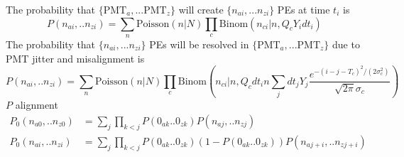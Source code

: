 \documentclass[12pt]{report}
\begin{document}
The probability that $\{\text{PMT}_a,...\text{PMT}_z\}$ will create $\{n_{ai},...n_{zi}\}$ PEs at time $t_i$ is
\begin{equation}
P(n_{ai},..n_{zi})=\sum_n\text{Poisson}(n|N)\prod_c\text{Binom}(n_{ci}|n, Q_cY_idt_i)
\end{equation}
The probability that $\{n_{ai},...n_{zi}\}$ PEs will be resolved in $\{\text{PMT}_a,...\text{PMT}_z\}$ due to PMT jitter and misalignment is
\begin{equation}
P(n_{ai},..n_{zi})=\sum_{n}\text{Poisson}(n|N)\prod_c\text{Binom}\left(n_{ci}|n,Q_cdt_in\sum_jdt_jY_j\frac{e^{-(i-j-T_c)^2/(2\sigma_c^2)}}{\sqrt{2\pi}\sigma_c}\right)
\end{equation}
$P$ alignment
\begin{equation}
\begin{split}
P_0(n_{a0},..n_{z0})&=\sum_j\prod_{k<j}P(0_{ak}..0_{zk})P(n_{aj},..n_{zj})\\
P_0(n_{ai},..n_{zi})&=\sum_j\prod_{k<j}P(0_{ak}..0_{zk})\left(1-P(0_{ak}..0_{zk})\right)P(n_{aj+i},..n_{zj+i})
\end{split}
\end{equation} 
\end{document}
